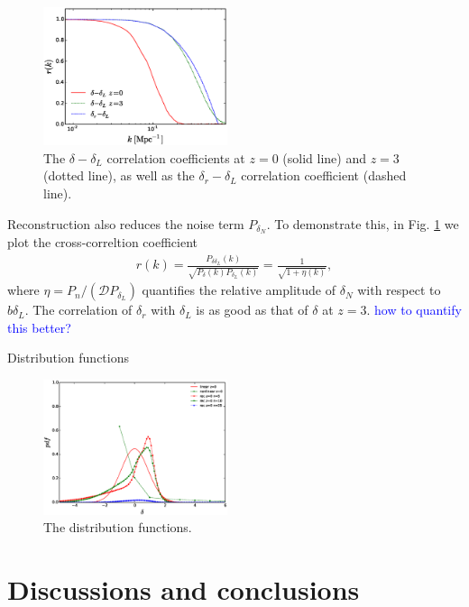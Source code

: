 \documentclass[aps,prd,twocolumn,showpacs,superscriptaddress,groupedaddress,nofootinbib]{revtex4}  %
\newcommand{\tcb}{\textcolor{blue}}
\newcommand{\bea}{\begin{eqnarray}}
\newcommand{\eea}{\end{eqnarray}}
\begin{document}
\begin{figure}[tbp]
\begin{center}
\includegraphics[width=0.48\textwidth]{f7x.eps}
\end{center}
\vspace{-0.7cm}
\caption{The $\delta-\delta_L$ correlation coefficients at $z=0$ (solid
line) and $z=3$ (dotted line), as well as the $\delta_r-\delta_L$ 
correlation coefficient (dashed line).}
\label{fig:xcc}
\end{figure}

Reconstruction also reduces the noise term $P_{\delta_N}$. To demonstrate this,
in Fig. \ref{fig:xcc} we plot the  cross-correltion coefficient 
\bea
r(k)=\frac{P_{\delta\delta_L}(k)}
{\sqrt{P_{\delta}(k)P_{\delta_L}(k)}}
=\frac{1}{\sqrt{1+\eta(k)}},
\eea
where $\eta=P_n/(\mathcal{D}P_{\delta_L})$ quantifies the relative amplitude
of $\delta_N$ with respect to $b\delta_L$. The correlation of $\delta_r$ with
$\delta_L$ is as good as that of $\delta$ at $z=3$.
\tcb{how to quantify this better?}

Distribution functions 
\begin{figure}[tbp]
\begin{center}
\includegraphics[width=0.48\textwidth]{f9.eps}
\end{center}
\vspace{-0.7cm}
\caption{The distribution functions.}
\label{fig:pdf}
\end{figure}




\section{Discussions and conclusions}
\end{document}
